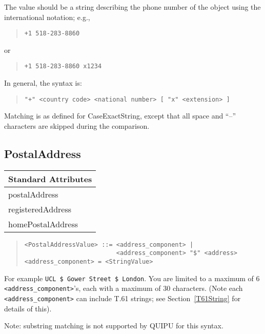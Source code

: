 The value should be a string describing the phone number of the object
using the international notation; e.g.,
\begin{quote}\begin{verbatim}
+1 518-283-8860
\end{verbatim}\end{quote}
or
\begin{quote}\begin{verbatim}
+1 518-283-8860 x1234
\end{verbatim}\end{quote}
In general, the syntax is:
\begin{quote}\begin{verbatim}
"+" <country code> <national number> [ "x" <extension> ]
\end{verbatim}\end{quote}

Matching is as defined for CaseExactString, except that all space and ``--''
characters are skipped during the comparison.

\subsection{PostalAddress}

\begin{center}\small
\begin{tabular}{|l|}\hline
Standard Attributes \\ \hline
	postalAddress\\
	registeredAddress\\
	homePostalAddress\\
\hline
\end{tabular}
\end{center}

\begin{quote}\begin{verbatim}
<PostalAddressValue> ::= <address_component> | 
                         <address_component> "$" <address>
<address_component> = <StringValue>
\end{verbatim}\end{quote}
For example \verb+UCL $ Gower Street $ London+.
You are limited to a maximum of 6 \verb+<address_component>+'s, each with a 
maximum of 30 characters.
(Note each \verb+<address_component>+ can include T.61 strings; see
Section~\ref{T61String} for details of this).

Note: substring matching is not supported by QUIPU for this syntax.


